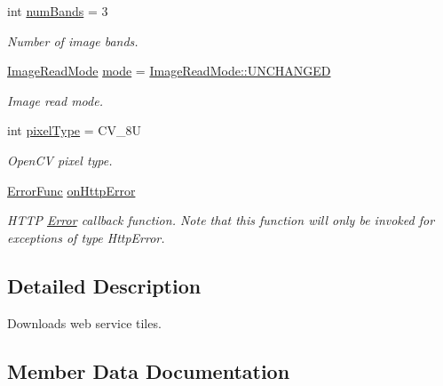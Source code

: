 \begin{DoxyCompactItemize}
int \hyperlink{structdg_1_1deepcore_1_1imagery_1_1_tile_downloader_afd6c4c2baaa6dfe52a2f45a6e5bd64ef}{num\+Bands} = 3
\begin{DoxyCompactList}\small\item\em Number of image bands. \end{DoxyCompactList}\item 
\hyperlink{group___imagery_module_ga1db94ae833853b71ed501bb1ea8c1c24}{Image\+Read\+Mode} \hyperlink{structdg_1_1deepcore_1_1imagery_1_1_tile_downloader_a33b7cac77d8a1690d08eda79fba5aae6}{mode} = \hyperlink{namespacedg_1_1deepcore_1_1imagery_ga1db94ae833853b71ed501bb1ea8c1c24a46335765005ff44b1fe1e38e5d2ddfcc}{Image\+Read\+Mode\+::\+U\+N\+C\+H\+A\+N\+G\+ED}
\begin{DoxyCompactList}\small\item\em Image read mode. \end{DoxyCompactList}\item 
int \hyperlink{structdg_1_1deepcore_1_1imagery_1_1_tile_downloader_ae1ce289c04410240e1232c2859491ed5}{pixel\+Type} = C\+V\+\_\+8U
\begin{DoxyCompactList}\small\item\em Open\+CV pixel type. \end{DoxyCompactList}\item 
\hyperlink{group___utility_module_gaa93ea71a4ed4c044369d3b323aec4435}{Error\+Func} \hyperlink{structdg_1_1deepcore_1_1imagery_1_1_tile_downloader_a98c544a47086337b9c92c189c5cbe6d4}{on\+Http\+Error}
\begin{DoxyCompactList}\small\item\em H\+T\+TP \hyperlink{classdg_1_1deepcore_1_1_error}{Error} callback function. Note that this function will only be invoked for exceptions of type Http\+Error. \end{DoxyCompactList}\end{DoxyCompactItemize}


\subsection{Detailed Description}
Downloads web service tiles. 

\subsection{Member Data Documentation}
